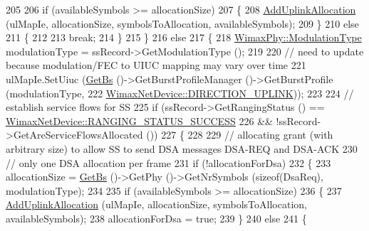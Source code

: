 \begin{DoxyCode}
205 
206           \textcolor{keywordflow}{if} (availableSymbols >= allocationSize)
207             \{
208               \hyperlink{classns3_1_1UplinkSchedulerSimple_a078c18f311ce90cbceab11a54cd4606e}{AddUplinkAllocation} (ulMapIe, allocationSize, symbolsToAllocation, 
      availableSymbols);
209             \}
210           \textcolor{keywordflow}{else}
211             \{
212 
213               \textcolor{keywordflow}{break};
214             \}
215         \}
216       \textcolor{keywordflow}{else}
217         \{
218           \hyperlink{classns3_1_1WimaxPhy_a044c5d8a48ca992c39c2a946f6e755fa}{WimaxPhy::ModulationType} modulationType = ssRecord->GetModulationType ();
219 
220           \textcolor{comment}{// need to update because modulation/FEC to UIUC mapping may vary over time}
221           ulMapIe.SetUiuc (\hyperlink{classns3_1_1UplinkScheduler_afe61b7de71d92d2dff1b135744a6ff7e}{GetBs} ()->GetBurstProfileManager ()->GetBurstProfile (modulationType,
222                                                                                  
      \hyperlink{classns3_1_1WimaxNetDevice_a194b6cf7eb59582328eb2531dc9ed884ad37a477621d1df190ff8d8fb933349cd}{WimaxNetDevice::DIRECTION\_UPLINK}));
223 
224           \textcolor{comment}{// establish service flows for SS}
225           \textcolor{keywordflow}{if} (ssRecord->GetRangingStatus () == 
      \hyperlink{classns3_1_1WimaxNetDevice_a2a74c0f01e51abc1851a630242e7b591a2a48f503c20971a1a5901af0b6d0746c}{WimaxNetDevice::RANGING\_STATUS\_SUCCESS}
226               && !ssRecord->GetAreServiceFlowsAllocated ())
227             \{
228 
229               \textcolor{comment}{// allocating grant (with arbitrary size) to allow SS to send DSA messages DSA-REQ and
       DSA-ACK}
230               \textcolor{comment}{// only one DSA allocation per frame}
231               \textcolor{keywordflow}{if} (!allocationForDsa)
232                 \{
233                   allocationSize = \hyperlink{classns3_1_1UplinkScheduler_afe61b7de71d92d2dff1b135744a6ff7e}{GetBs} ()->GetPhy ()->GetNrSymbols (\textcolor{keyword}{sizeof}(DsaReq), modulationType);
234 
235                   \textcolor{keywordflow}{if} (availableSymbols >= allocationSize)
236                     \{
237                       \hyperlink{classns3_1_1UplinkSchedulerSimple_a078c18f311ce90cbceab11a54cd4606e}{AddUplinkAllocation} (ulMapIe, allocationSize, symbolsToAllocation,
       availableSymbols);
238                       allocationForDsa = \textcolor{keyword}{true};
239                     \}
240                   \textcolor{keywordflow}{else}
241                     \{

\end{DoxyCode}
